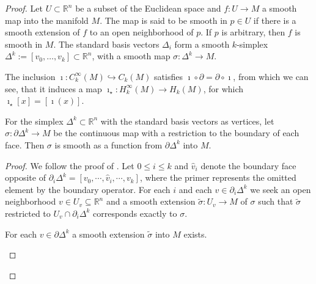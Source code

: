 \documentclass[envcountsect,runningheads]{llncs}
\begin{document}
\begin{proof}
Let $U \subset \mathbb{R}^n$ be a subset of the Euclidean space and $f: U \rightarrow M$ a smooth map into the manifold $M$. The map is said to be smooth in $p \in U$ if there is a smooth extension of $f$ to an open neighborhood of $p$. If $p$ is arbitrary, then $f$ is smooth in $M$. The standard basis vectors $\Delta_i$ form a smooth $k$-simplex $\Delta^k := [v_0, \ldots, v_k] \subset \mathbb{R}^n$, with a smooth map $\sigma: \Delta^k  \rightarrow M$.

The inclusion $\imath: C_{k}^{\infty}(M) \hookrightarrow C_k(M)$ satisfies $\imath \circ \partial = \partial \circ \imath$, from which we can see, that it induces a map $\imath_{\star}: H_{k}^{\infty}(M) \rightarrow H_k(M)$, for which $\imath_{\star}[x] = [\imath(x)]$.

\begin{lemma}
For the simplex $\Delta^k \subset \mathbb{R}^n$ with the standard basis vectors as vertices, let $\sigma: \partial \Delta^k \rightarrow M$ be the continuous map with a restriction to the boundary of each face. Then $\sigma$ is smooth as a function from $\partial \Delta^k$ into $M$.
\end{lemma}

\begin{proof}
We follow the proof of \cite[Lem.~2.1]{parkproof}. Let $0 \leq i \leq k$ and $\hat{v}_i$ denote the boundary face opposite of $\partial_{i} \Delta^k = [v_0, \cdots, \hat{v}_i, \cdots, v_k]$, where the primer represents the omitted element by the boundary operator. For each $i$ and each $v \in\partial_{i} \Delta^k$ we seek an open neighborhood $v \in U_v \subseteq \mathbb{R}^n$ and a smooth extension $\tilde{\sigma}: U_v \rightarrow M$ of $\sigma$ such that $\tilde{\sigma}$ restricted to $U_v \cap \partial_{i}\Delta^k$ corresponds exactly to $\sigma$.

\begin{proposition}
For each $v \in \partial \Delta^k$ a smooth extension $\tilde{\sigma}$ into $M$ exists.
\label{smoothextension}
\end{proposition}


\end{proof}
\end{proof}
\end{document}

